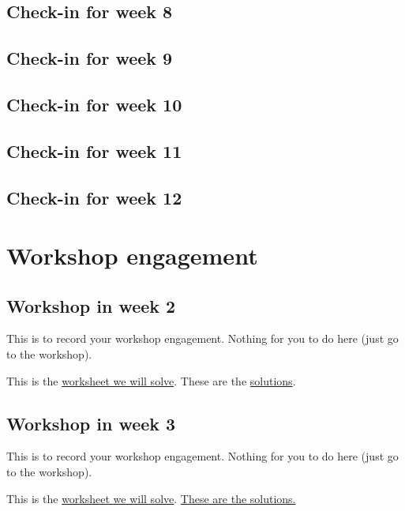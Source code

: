 \documentclass{amsart}
\begin{document}
\subsection{Check-in for week 8}
\label{sec:org569c1e7}
\subsection{Check-in for week 9}
\label{sec:org8a5a271}
\subsection{Check-in for week 10}
\label{sec:orgb621986}
\subsection{Check-in for week 11}
\label{sec:orgb63789f}
\subsection{Check-in for week 12}
\label{sec:org3fa26bc}
\section{Workshop engagement}
\label{sec:org9d74cc0}
\subsection{Workshop in week 2}
\label{sec:org6cc3b37}
This is to record your workshop engagement.  Nothing for you to do here (just go to the workshop).

This is the \href{https://canvas.anu.edu.au/files/715135/download?download\_frd=1\&verifier=qZXMO7vBnxUkyQ70jQuHX7l3bPelONzvtQ8YBjHt}{worksheet we will solve}.
These are the \href{https://canvas.anu.edu.au/files/733257/download?download\_frd=1\&verifier=TkxTB474Whc3QcrPZw0SjxbGRauTW1tTwORZKUZT}{solutions}.
\subsection{Workshop in week 3}
\label{sec:org95efdbf}
This is to record your workshop engagement.  Nothing for you to do here (just go to the workshop).

This is the \href{https://canvas.anu.edu.au/files/725876/download?download\_frd=1\&verifier=F9bBqZbuIucG20baWB5Z337sZiAJbqGTaayBUX1d}{worksheet we will solve}.
\href{https://canvas.anu.edu.au/files/738776/download?download\_frd=1\&verifier=eA2jRWwJZqkeQRrJPpBiTsyrJaN6EAAhwCT4lJZj}{These are the solutions.}
\end{document}
